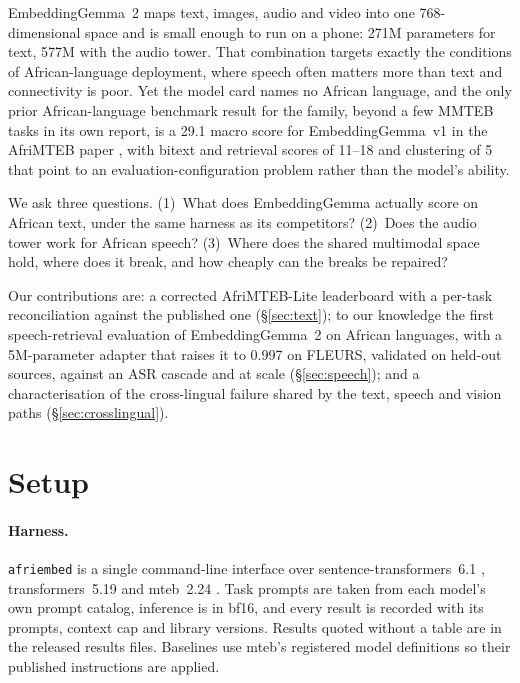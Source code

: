 \documentclass[11pt]{article}
\newcommand{\eg}{EmbeddingGemma}
\newcommand{\egtwo}{EmbeddingGemma~2}
\begin{document}
\egtwo{} \citep{google2026embeddinggemma2} maps text, images, audio and video
into one 768-dimensional space and is small enough to run on a phone: 271M
parameters for text, 577M with the audio tower. That combination targets
exactly the conditions of African-language deployment, where speech often
matters more than text and connectivity is poor. Yet the model card names no
African language, and the only prior African-language benchmark result for the family, beyond a
few MMTEB tasks in its own report, is a 29.1 macro score for \eg{}~v1 \citep{vera2025embeddinggemma} in the AfriMTEB
paper \citep{uemura2026afrimteb}, with bitext and retrieval scores of 11--18 and clustering of 5 that point to an evaluation-configuration problem rather than the model's ability.

We ask three questions. (1)~What does \eg{} actually score on African text,
under the same harness as its competitors? (2)~Does the audio tower work for
African speech? (3)~Where does the shared multimodal space hold, where does it
break, and how cheaply can the breaks be repaired?

Our contributions are: a corrected AfriMTEB-Lite leaderboard with a per-task
reconciliation against the published one (\S\ref{sec:text}); to our knowledge the first speech-retrieval evaluation of \egtwo{} on African languages, with a
5M-parameter adapter that raises it to 0.997 on FLEURS, validated on held-out sources,
against an ASR cascade and at scale (\S\ref{sec:speech}); and a
characterisation of the cross-lingual failure shared by the text, speech and
vision paths (\S\ref{sec:crosslingual}).

\section{Setup}
\label{sec:setup}

\paragraph{Harness.}
\texttt{afriembed} is a single command-line interface over
sentence-transformers~6.1 \citep{reimers2019sentencebert}, transformers~5.19
and mteb~2.24 \citep{muennighoff2023mteb}. Task prompts are taken from each
model's own prompt catalog, inference is in bf16, and every result is recorded with its prompts, context cap and library versions. Results quoted without a table are in the released results files. Baselines use mteb's
registered model definitions so their published instructions are applied.
\end{document}
